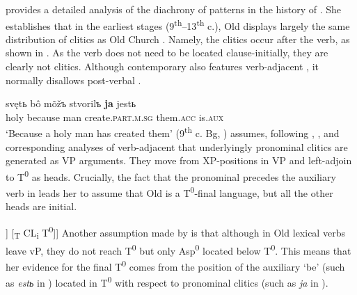\documentclass[output=paper,modfonts,newtxmath,hidelinks]{langscibook}
\begin{document}
\citet{pancheva2005} provides a detailed analysis of the diachrony of  patterns in the history of . She establishes that in the earliest stages (9\textsuperscript{th}{}--13\textsuperscript{th} c.), Old  displays largely the same distribution of clitics as Old Church . Namely, the clitics occur after the verb, as shown in . As the verb does not need to be located clause-initially, they are clearly not  clitics. Although contemporary  also features verb-adjacent , it normally disallows post-verbal .





\ea \label{11:ex2}
\gll svętь bô mõžъ stvorilъ \textbf{ja} jestь \\
     holy because man create.\textsc{part.m.sg} them.\textsc{acc} is.\textsc{aux}\\
\glt `Because a holy man has created them' \hfill (9\textsuperscript{th} c. Bg, \citealt[139]{pancheva2005})
\z
\citeauthor{pancheva2005} assumes, following \citet{kayne1991}, \citet{Chomsky1995}, and corresponding analyses of verb-adjacent  that underlyingly pronominal clitics are generated as VP arguments. They move from XP-positions in VP and left-adjoin to T\textsuperscript{0} as heads. Crucially, the fact that the  pronominal  precedes the auxiliary verb in  leads her to assume that Old  is a T\textsuperscript{0}{}-final language, but all the other heads are initial.

\ea \label{11:ex3}
\glt [\textsubscript{TP} [\textsubscript{vP} [\textsubscript{V’} t\textsubscript{i} V\textsuperscript{0} ]] [\textsubscript{T} CL\textsubscript{i} T\textsuperscript{0}]]  \hfill \citep[139]{pancheva2005}
\z
Another assumption made by \citet[146]{pancheva2005} is that although in Old  lexical verbs leave vP, they do not reach T\textsuperscript{0} but only Asp\textsuperscript{0} located below T\textsuperscript{0}. This means that her evidence for the final T\textsuperscript{0} comes from the position of the auxiliary `be' (such as \textit{estь} in ) located in T\textsuperscript{0} with respect to pronominal clitics (such as \textit{ja} in ).
\end{document}
